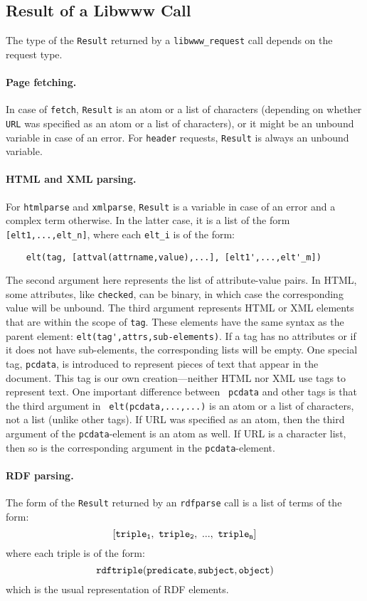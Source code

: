 \subsection{Result of a Libwww Call}

The type of the {\tt Result} returned by a {\tt libwww\_request} call
depends on the request type. 

\paragraph{Page fetching.}
In case of {\tt fetch}, {\tt Result} is an atom or a list of characters
(depending on whether {\tt URL} was specified as an atom or a list of
characters), or it might be an unbound variable in case of an error. For
{\tt header} requests, {\tt Result} is always an unbound variable.

\paragraph{HTML and XML parsing.}
For {\tt htmlparse} and {\tt xmlparse}, {\tt Result} is a variable in case
of an error and a complex term otherwise. In the latter case, it is a list
of the form {\tt [elt1,...,elt\_n]}, where each {\tt elt\_i} is of the
form:
\begin{verbatim}
    elt(tag, [attval(attrname,value),...], [elt1',...,elt'_m])
\end{verbatim}
The second argument here represents the list of attribute-value pairs.  In
HTML, some attributes, like {\tt checked}, can be binary, in which case the
corresponding value will be unbound. The third argument represents
HTML or XML elements that are within the scope of {\tt tag}. These elements
have the same syntax as the parent element:
\verb|elt(tag',attrs,sub-elements)|. If a tag has no attributes or if
it does not have sub-elements, the corresponding lists will be empty.
One special tag, {\tt pcdata}, is introduced to represent pieces of text
that appear in the document. This tag is our own creation---neither HTML
nor XML use tags to represent text. One important difference between {\tt
  pcdata} and other tags is that the third argument in {\tt
  elt(pcdata,...,...)} is an atom or a list of characters, not a list
(unlike other tags). If URL was specified as an atom, then the third
argument of the {\tt pcdata}-element is an atom as well. If URL is a
character list, then so is the corresponding argument in the
{\tt pcdata}-element.

\paragraph{RDF parsing.}
The form of the {\tt Result} returned by an {\tt rdfparse} call is 
a list of terms of the form:
\[
\tt
[triple_1,~triple_2,~...,~triple_n]
\]
where each triple is of the form:
\[
\tt
rdftriple(predicate, subject, object)
\]
which is the usual representation of RDF elements.


